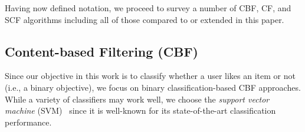 %
%

Having now defined notation, we proceed to survey a number of 
CBF, CF, and SCF algorithms including all of those 
compared to or extended in this paper.

\subsection{Content-based Filtering (CBF)}

\label{sec:cbf}

Since our objective in this work is to classify whether a user likes
an item or not (i.e., a binary objective), we focus on binary
classification-based CBF approaches.  While a variety of
classifiers may work well, we choose the
\emph{support vector machine} (SVM)~\cite{svm} since it is
well-known for its state-of-the-art classification performance.

